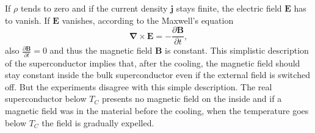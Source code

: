 \documentclass[../main/main.tex]{subfiles}
\begin{document}
If $\rho$ tends to zero and if the current density $\boldsymbol{j}$ stays finite, the electric field $\boldsymbol{E}$ has to vanish. If $\boldsymbol{E}$ vanishes, according to the Maxwell's equation
\begin{equation} \label{eq:Maxw_curlE}
     \boldsymbol{\nabla}  \times \boldsymbol{E} = -\frac{\partial \boldsymbol{B}}{\partial t},
\end{equation}
also $\frac{\partial \boldsymbol{B}}{\partial t} = 0$ and thus the magnetic field $\boldsymbol{B}$ is constant. This simplistic description of the superconductor implies that, after the cooling, the magnetic field should stay constant inside the bulk superconductor even if the external field is switched off. But the experiments disagree with this simple description. The real superconductor below $T_C$ presents no magnetic field on the inside and if a magnetic field was in the material before the cooling, when the temperature goes below $T_C$ the field is gradually expelled.
\end{document}
